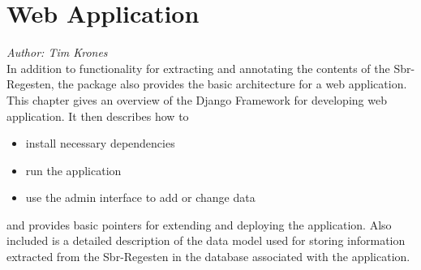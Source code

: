 \section{Web Application}

\emph{Author: Tim Krones} \\

In addition to functionality for extracting and annotating the
contents of the Sbr-Regesten, the package also provides the basic
architecture for a web application. This chapter gives an overview of
the Django Framework for developing web application. It then describes
how to

\begin{itemize}
\item install necessary dependencies
\item run the application
\item use the admin interface to add or change data
\end{itemize}

and provides basic pointers for extending and deploying the
application. Also included is a detailed description of the data model
used for storing information extracted from the Sbr-Regesten in the
database associated with the application.


